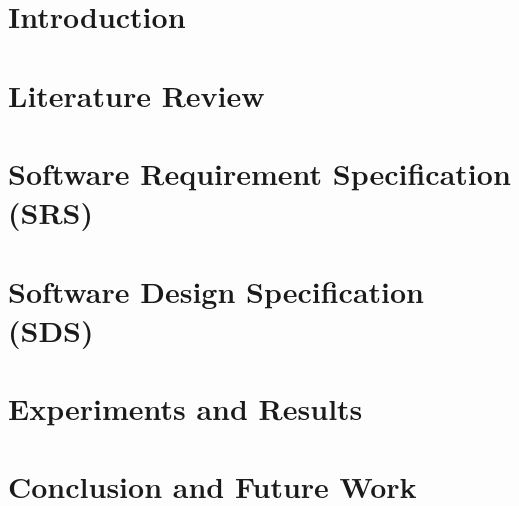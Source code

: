 \documentclass[12pt,twosided]{report}
\begin{document}
\titleformat{\section}{\normalfont\bfseries}{\thesection}{1em}{}

\titleformat{\subsection}{\normalfont}{\thesubsection}{0em}{\hspace{1em}}

\titleformat{\subsubsection}{\normalfont\itshape}{\thesubsection}{1em}{}
 
\chapter{Introduction}
\label{chap:intro}


\chapter{Literature Review}
\label{chap:lit}


\chapter{Software Requirement Specification (SRS)}
\label{chap:srs}


\chapter{Software Design Specification (SDS)}
\label{chap:sds}


\chapter{Experiments and Results}
\label{chap:results}


\chapter{Conclusion and Future Work}
\label{chap:outro}

\end{document}
